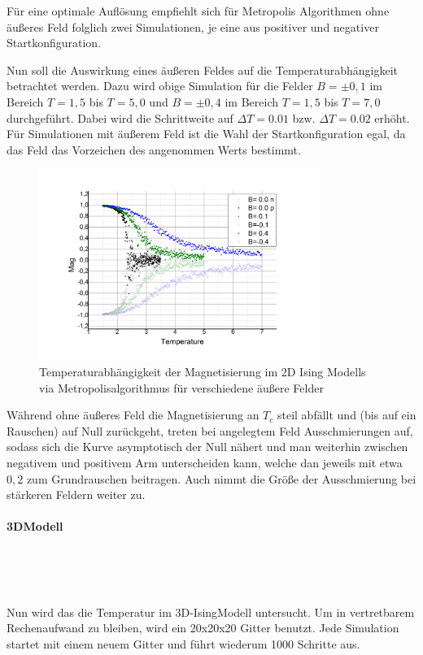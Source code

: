 Für eine optimale Auflösung empfiehlt sich für Metropolis Algorithmen ohne äußeres Feld folglich zwei Simulationen, je eine aus positiver und negativer Startkonfiguration.


Nun soll die Auswirkung eines äußeren Feldes auf die Temperaturabhängigkeit betrachtet werden. Dazu wird obige Simulation für die Felder $B=\pm 0,1$ im Bereich $T=1,5$ bis $T=5,0$ und $B=\pm 0,4$ im Bereich $T=1,5$ bis $T=7,0$ durchgeführt. Dabei wird die Schrittweite auf $\Delta T = 0.01$ bzw. $\Delta T = 0.02$ erhöht. Für Simulationen mit äußerem Feld ist die Wahl der Startkonfiguration egal, da das Feld das Vorzeichen des angenommen Werts bestimmt.
\begin{figure}[H]
	\centering
	\includegraphics[width=0.8\textwidth]{../Graph_Export/MP2D/m(T)_MP2D_50_Plot.jpg}	
	\caption{Temperaturabhängigkeit der Magnetisierung im 2D Ising Modells via Metropolisalgorithmus für verschiedene äußere Felder}
	\label{mp2db}
\end{figure}
Während ohne äußeres Feld die Magnetisierung an $T_{c}$ steil abfällt und (bis auf ein Rauschen) auf Null zurückgeht, treten bei angelegtem Feld Ausschmierungen auf, sodass sich die Kurve asymptotisch der Null nähert und man weiterhin zwischen negativem und positivem Arm unterscheiden kann, welche dan jeweils mit etwa $0,2$ zum Grundrauschen beitragen. Auch nimmt die Größe der Ausschmierung bei stärkeren Feldern weiter zu.


\paragraph{3DModell}

\

\

Nun wird das die Temperatur im 3D-IsingModell untersucht. Um in vertretbarem Rechenaufwand zu bleiben, wird ein 20x20x20 Gitter benutzt. Jede Simulation startet mit einem neuem Gitter und führt wiederum 1000 Schritte aus.


